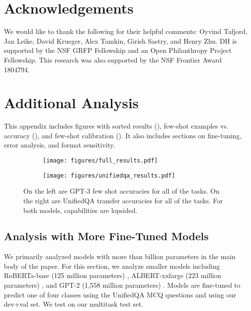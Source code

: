 \documentclass{article} \usepackage{iclr2021_conference, times}
\begin{document}
\newpage
\section*{Acknowledgements}
We would like to thank the following for their helpful comments: Oyvind Tafjord, Jan Leike, David Krueger, Alex Tamkin, Girish Sastry, and Henry Zhu. DH is supported by the NSF GRFP Fellowship and an Open Philanthropy Project Fellowship. This research was also supported by the NSF Frontier Award 1804794.
 





\newpage

\newpage
\appendix


\section{Additional Analysis}\label{app:additional}





This appendix includes figures with sorted results (), few-shot examples vs. accuracy (), and few-shot calibration (). It also includes sections on fine-tuning, error analysis, and format sensitivity.

\begin{figure}[h]
\begin{subfigure}{.49\textwidth}
\centering
    \texttt{[image: figures/full\_results.pdf]}
\end{subfigure}\hfill \begin{subfigure}{.49\textwidth}
\centering
    \texttt{[image: figures/unifiedqa\_results.pdf]}
\end{subfigure}
\caption{On the left are GPT-3 few shot accuracies for all of the  tasks. On the right are UnifiedQA transfer accuracies for all of the  tasks. For both models, capabilities are lopsided.}\label{fig:unifiedqaresults}
\end{figure}


\subsection{Analysis with More Fine-Tuned Models}
We primarily analyzed models with more than  billion parameters in the main body of the paper. For this section, we analyze smaller models including RoBERTa-base (125 million parameters) \citep{RobertaLiu2019AR}, ALBERT-xxlarge (223 million parameters) \citep{AlbertLan2020}, and GPT-2 (1,558 million parameters) \citep{Radford2019LanguageMA}.
Models are fine-tuned to predict one of four classes using the UnifiedQA MCQ questions and using our dev+val set. We test on our multitask test set.
\end{document}
